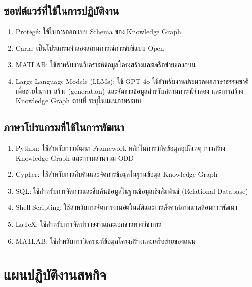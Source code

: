 \subsection{ซอฟต์แวร์ที่ใช้ในการปฏิบัติงาน}\label{subsec:software-used}
\begin{enumerate}
    \item Protégé: ใช้ในการออกแบบ Schema ของ Knowledge Graph
    \item Carla: เป็นโปรแกรมจำลองสถานการณ์การขับขี่แบบ Open
    \item MATLAB: ใช้สำหรับงานวิเคราะห์ข้อมูลโครงสร้างและเครือข่ายของถนน
    \item Large Language Models (LLMs): ใช้ GPT-4o ใช้สำหรับงานประมวลผลภาษาธรรมชาติ เพื่อช่วยในการ สร้าง (generation) และจัดการข้อมูลสำหรับสถานการณ์จำลอง และการสร้าง Knowledge Graph ตามที่ ระบุในแผนภาพระบบ
\end{enumerate}

\subsection{ภาษาโปรแกรมที่ใช้ในการพัฒนา}\label{subsec:programming-languages}
\begin{enumerate}
\item Python: ใช้สำหรับการพัฒนา Framework หลักในการสกัดข้อมูลอุบัติเหตุ การสร้าง Knowledge Graph และการผสานรวม ODD
\item Cypher: ใช้สำหรับการสืบค้นและจัดการข้อมูลในฐานข้อมูล Knowledge Graph
\item SQL: ใช้สำหรับการจัดการและสืบค้นข้อมูลในฐานข้อมูลเชิงสัมพันธ์ (Relational Database)
\item Shell Scripting: ใช้สำหรับการจัดการงานอัตโนมัติและการตั้งค่าสภาพแวดล้อมการพัฒนา
\item LaTeX: ใช้สำหรับการจัดทำรายงานและเอกสารทางวิชาการ
\item MATLAB: ใช้สำหรับการวิเคราะห์ข้อมูลโครงสร้างและเครือข่ายของถนน
\end{enumerate}

\section{แผนปฏิบัติงานสหกิจ}\label{sec:work-plan}

